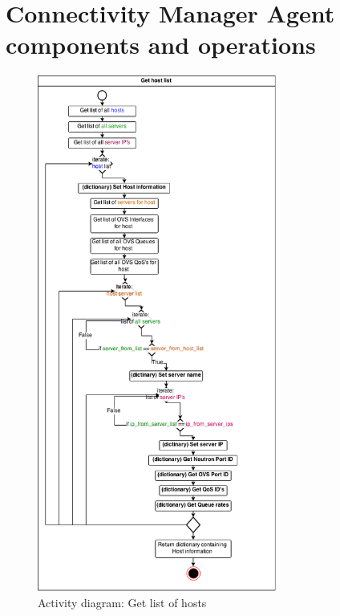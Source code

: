 \section{Connectivity Manager Agent components and operations}

\begin{figure}[H]
\centering

\includegraphics[width=0.7\textwidth]{images/design/activity_host_list}

\caption{Activity diagram: Get list of hosts}
\end{figure}

